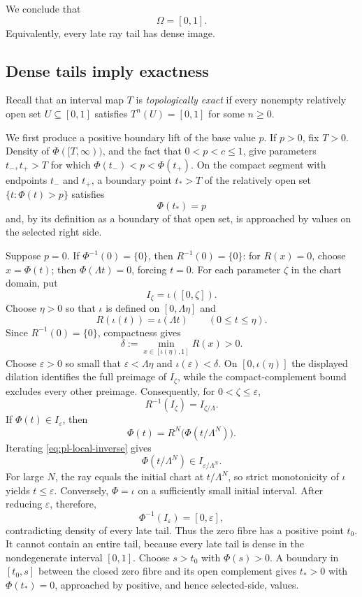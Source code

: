 \documentclass[11pt]{article}
\theoremstyle{definition}
\theoremstyle{remark}
\newcommand{\I}{[0,1]}
\begin{document}
We conclude that
\begin{equation}\label{eq:pl-Omega-full}
 \Omega=\I.
\end{equation}
Equivalently, every late ray tail has dense image.

\subsection{Dense tails imply exactness}

Recall that an interval map \(T\) is \emph{topologically exact} if every
nonempty relatively open set \(U\subseteq\I\) satisfies
\(T^n(U)=\I\) for some \(n\geq0\).

We first produce a positive boundary lift of the base value \(p\).
If \(p>0\), fix \(T>0\).  Density of \(\Phi([T,\infty))\), and the fact that
\(0<p<c\leq1\), give parameters \(t_-,t_+>T\) for which
\(\Phi(t_-)<p<\Phi(t_+)\).  On the compact segment with endpoints
\(t_-\) and \(t_+\), a boundary point \(t_*>T\) of the relatively open set
\(\{t:\Phi(t)>p\}\) satisfies
\begin{equation}\label{eq:pl-boundary-lift}
 \Phi(t_*)=p
\end{equation}
and, by its definition as a boundary of that open set, is approached by
values on the selected right side.

Suppose \(p=0\).  If \(\Phi^{-1}(0)=\{0\}\), then
\(R^{-1}(0)=\{0\}\): for \(R(x)=0\), choose \(x=\Phi(t)\); then
\(\Phi(\Lambda t)=0\), forcing \(t=0\).  For each parameter \(\zeta\) in
the chart domain, put
\[
 I_\zeta=\iota([0,\zeta]).
\]
Choose \(\eta>0\) so that \(\iota\) is defined on
\([0,\Lambda\eta]\) and
\[
 R(\iota(t))=\iota(\Lambda t)\qquad(0\leq t\leq\eta).
\]
Since \(R^{-1}(0)=\{0\}\), compactness gives
\[
 \delta:=\min_{x\in[\iota(\eta),1]}R(x)>0.
\]
Choose \(\varepsilon>0\) so small that
\(\varepsilon<\Lambda\eta\) and \(\iota(\varepsilon)<\delta\).
On \([0,\iota(\eta)]\) the displayed dilation identifies the full preimage
of \(I_\zeta\), while the compact-complement bound excludes every other
preimage.  Consequently, for \(0<\zeta\leq\varepsilon\),
\begin{equation}\label{eq:pl-local-inverse}
  R^{-1}(I_\zeta)=I_{\zeta/\Lambda}.
\end{equation}
If \(\Phi(t)\in I_\varepsilon\), then
\[
 \Phi(t)=R^N\bigl(\Phi(t/\Lambda^N)\bigr).
\]
Iterating \eqref{eq:pl-local-inverse} gives
\[
 \Phi(t/\Lambda^N)\in I_{\varepsilon/\Lambda^N}.
\]
For large \(N\), the ray equals the initial chart at \(t/\Lambda^N\), so
strict monotonicity of \(\iota\) yields \(t\leq\varepsilon\).  Conversely,
\(\Phi=\iota\) on a sufficiently small initial interval.  After reducing
\(\varepsilon\), therefore,
\[
 \Phi^{-1}(I_\varepsilon)=[0,\varepsilon],
\]
contradicting density of every late tail.  Thus the zero fibre has a positive
point \(t_0\).  It cannot contain an entire tail, because every late tail is
dense in the nondegenerate interval \(\I\).  Choose \(s>t_0\) with
\(\Phi(s)>0\).  A boundary in \([t_0,s]\) between the closed zero fibre and
its open complement gives \(t_*>0\) with \(\Phi(t_*)=0\), approached by
positive, and hence selected-side, values.
\end{document}
